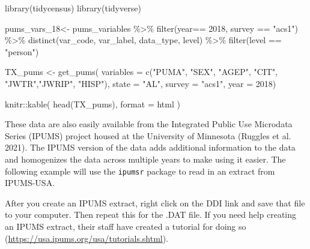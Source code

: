 \documentclass[
  letterpaper,
  DIV=11,
  numbers=noendperiod]{scrreprt}
\newenvironment{Shaded}{\begin{snugshade}}{\end{snugshade}}
\newcommand{\AttributeTok}[1]{\textcolor[rgb]{0.40,0.45,0.13}{#1}}
\newcommand{\DecValTok}[1]{\textcolor[rgb]{0.68,0.00,0.00}{#1}}
\newcommand{\FunctionTok}[1]{\textcolor[rgb]{0.28,0.35,0.67}{#1}}
\newcommand{\NormalTok}[1]{\textcolor[rgb]{0.00,0.23,0.31}{#1}}
\newcommand{\OtherTok}[1]{\textcolor[rgb]{0.00,0.23,0.31}{#1}}
\newcommand{\SpecialCharTok}[1]{\textcolor[rgb]{0.37,0.37,0.37}{#1}}
\newcommand{\StringTok}[1]{\textcolor[rgb]{0.13,0.47,0.30}{#1}}
\begin{document}
\begin{Shaded}
\begin{Highlighting}[]
\FunctionTok{library}\NormalTok{(tidycensus)}
\FunctionTok{library}\NormalTok{(tidyverse)}

\NormalTok{pums\_vars\_18}\OtherTok{\textless{}{-}}\NormalTok{ pums\_variables }\SpecialCharTok{\%\textgreater{}\%}
  \FunctionTok{filter}\NormalTok{(year}\SpecialCharTok{==} \DecValTok{2018}\NormalTok{, survey }\SpecialCharTok{==} \StringTok{"acs1"}\NormalTok{) }\SpecialCharTok{\%\textgreater{}\%}
  \FunctionTok{distinct}\NormalTok{(var\_code, var\_label, data\_type, level) }\SpecialCharTok{\%\textgreater{}\%}
  \FunctionTok{filter}\NormalTok{(level }\SpecialCharTok{==} \StringTok{"person"}\NormalTok{)}

\NormalTok{TX\_pums }\OtherTok{\textless{}{-}} \FunctionTok{get\_pums}\NormalTok{(}
  \AttributeTok{variables =} \FunctionTok{c}\NormalTok{(}\StringTok{"PUMA"}\NormalTok{, }\StringTok{"SEX"}\NormalTok{, }\StringTok{"AGEP"}\NormalTok{, }\StringTok{"CIT"}\NormalTok{, }\StringTok{"JWTR"}\NormalTok{,}\StringTok{"JWRIP"}\NormalTok{, }\StringTok{"HISP"}\NormalTok{),}
  \AttributeTok{state =} \StringTok{"AL"}\NormalTok{,}
  \AttributeTok{survey =} \StringTok{"acs1"}\NormalTok{,}
  \AttributeTok{year =} \DecValTok{2018}\NormalTok{)}
\end{Highlighting}
\end{Shaded}

\begin{Shaded}
\begin{Highlighting}[]
\NormalTok{knitr}\SpecialCharTok{::}\FunctionTok{kable}\NormalTok{(}
  \FunctionTok{head}\NormalTok{(TX\_pums),}
  \AttributeTok{format =} \StringTok{\textquotesingle{}html\textquotesingle{}}
\NormalTok{  )}
\end{Highlighting}
\end{Shaded}

These data are also easily available from the Integrated Public Use
Microdata Series (IPUMS) project housed at the University of Minnesota
(Ruggles et al. 2021). The IPUMS version of the data adds additional
information to the data and homogenizes the data across multiple years
to make using it easier. The following example will use the
\texttt{ipumsr} package to read in an extract from IPUMS-USA.

After you create an IPUMS extract, right click on the DDI link and save
that file to your computer. Then repeat this for the .DAT file. If you
need help creating an IPUMS extract, their staff have created a tutorial
for doing so (\url{https://usa.ipums.org/usa/tutorials.shtml}).
\end{document}
